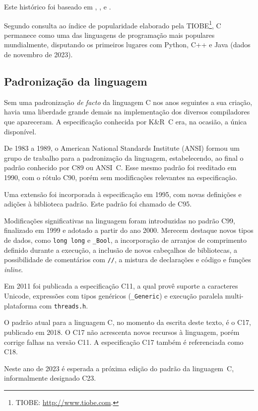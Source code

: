 \documentclass[
  11pt,
  a4paper,
]{scrbook}
\begin{document}
Este histórico foi baseado em \textcite{richards1969},
\textcite{johnson1973}, \textcite{ritchie1978} e \textcite{ritchie1993}.

Segundo consulta ao índice de popularidade elaborado pela
TIOBE\footnote{TIOBE: \url{http://www.tiobe.com}.}, C permanece como uma
das linguagens de programação mais populares mundialmente, disputando os
primeiros lugares com Python, C++ e Java (dados de novembro de 2023).

\subsection{Padronização da
linguagem}\label{sec-padronizacao-da-linguagem}

Sem uma padronização \emph{de facto} da linguagem C nos anos seguintes a
sua criação, havia uma liberdade grande demais na implementação dos
diversos compiladores que apareceram. A especificação conhecida por
K\&R~C era, na ocasião, a única disponível.

De 1983 a 1989, o American National Standards Institute (ANSI) formou um
grupo de trabalho para a padronização da linguagem, estabelecendo, ao
final o padrão conhecido por C89 ou ANSI~C. Esse mesmo padrão foi
reeditado em 1990, com o rótulo C90, porém sem modificações relevantes
na especificação.

Uma extensão foi incorporada à especificação em 1995, com novas
definições e adições à biblioteca padrão. Este padrão foi chamado de
C95.

Modificações significativas na linguagem foram introduzidas no padrão
C99, finalizado em 1999 e adotado a partir do ano 2000. Merecem destaque
novos tipos de dados, como \texttt{long\ long} e \texttt{\_Bool}, a
incorporação de arranjos de comprimento definido durante a execução, a
inclusão de novos cabeçalhos de bibliotecas, a possibilidade de
comentários com \texttt{//}, a mistura de declarações e código e funções
\emph{inline}.

Em 2011 foi publicada a especificação C11, a qual provê suporte a
caracteres Unicode, expressões com tipos genéricos (\texttt{\_Generic})
e execução paralela multi-plataforma com \texttt{threads.h}.

O padrão atual para a linguagem C, no momento da escrita deste texto, é
o C17, publicado em 2018. O C17 não acrescenta novos recursos à
linguagem, porém corrige falhas na versão C11. A especificação C17
também é referenciada como C18.

Neste ano de 2023 é esperada a próxima edição do padrão da linguagem~C,
informalmente designado C23.
\end{document}
